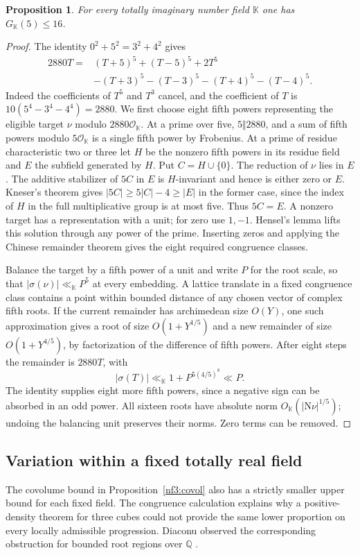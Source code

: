 \documentclass[11pt,letterpaper]{article}
\newtheorem{proposition}[proposition]{Proposition}
\theoremstyle{definition}
\numberwithin{equation}{section}
\begin{document}
\begin{proposition}\label{nf5:imaginary-sixteen}
For every totally imaginary number field $\mathbb K$ one has
$G_{\mathbb K}(5)\le16$.
\end{proposition}
\begin{proof}
The identity $0^2+5^2=3^2+4^2$ gives
\begin{align*}
 2880T={}&(T+5)^5+(T-5)^5+2T^5\\
         &-(T+3)^5-(T-3)^5-(T+4)^5-(T-4)^5 .
\end{align*}
Indeed the coefficients of $T^5$ and $T^3$ cancel, and the coefficient
of $T$ is $10(5^4-3^4-4^4)=2880$. We first choose eight fifth powers
representing the eligible target $\nu$ modulo $2880\mathcal O_{\mathbb K}$.
At a prime over five, $5\Vert2880$, and a sum of fifth powers modulo
$5\mathcal O_{\mathbb K}$ is a single fifth power by Frobenius.
At a prime of residue characteristic two or three let $H$ be the
nonzero fifth powers in its residue field and $E$ the subfield
generated by $H$. Put $C=H\cup\{0\}$. The reduction of $\nu$
lies in $E$. The additive stabilizer of $5C$ in $E$ is $H$-invariant
and hence is either zero or $E$. Kneser's theorem \cite{edkneser}
gives $|5C|\ge5|C|-4\ge|E|$ in the former case, since the
index of $H$ in the full multiplicative group is at most five.
Thus $5C=E$. A nonzero target has a representation with a unit;
for zero use $1,-1$. Hensel's lemma lifts this solution through
any power of the prime. Inserting zeros and applying the Chinese
remainder theorem gives the eight required congruence classes.

Balance the target by a fifth power of a unit and write $P$ for
the root scale, so that $|\sigma(\nu)|\ll_{\mathbb K}P^5$ at every
embedding. A lattice translate in a fixed congruence class contains
a point within bounded distance of any chosen vector of complex
fifth roots. If the current remainder has archimedean size $O(Y)$,
one such approximation gives a root of size $O(1+Y^{1/5})$
and a new remainder of size $O(1+Y^{4/5})$, by factorization
of the difference of fifth powers. After eight steps the remainder
is $2880T$, with
\[
  |\sigma(T)|\ll_{\mathbb K}1+P^{5(4/5)^8}\ll P .
\]
The identity supplies eight more fifth powers, since a negative
sign can be absorbed in an odd power. All sixteen roots have
absolute norm $O_{\mathbb K}(|\mathrm N\nu|^{1/5})$; undoing
the balancing unit preserves their norms. Zero terms can be removed.
\end{proof}

\subsection{Variation within a fixed totally real field}\label{nf3:progressions}
The covolume bound in Proposition~\ref{nf3:covol} also has a strictly
smaller upper bound for each fixed field. The congruence calculation
explains why a positive-density theorem for three cubes could not
provide the same lower proportion on every locally admissible
progression. Diaconu observed the corresponding obstruction for
bounded root regions over $\mathbb Q$ \cite{nf3:diaconu}.
\end{document}
